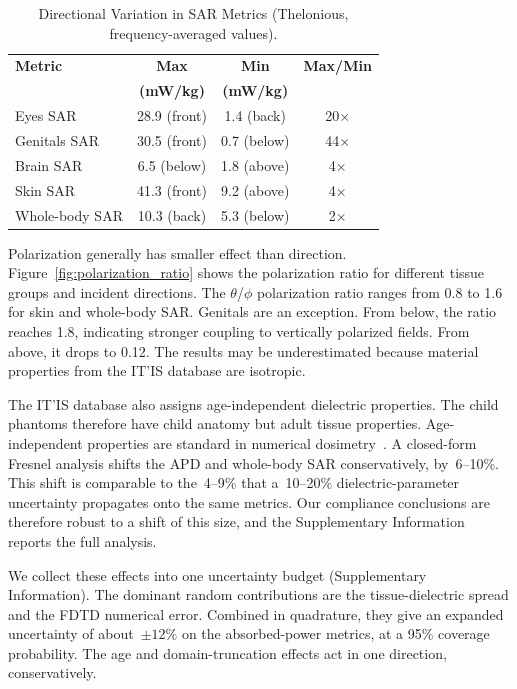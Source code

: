 \documentclass{iopjournal}
\begin{document}
\begin{table}[!t]
\centering
\caption{Directional Variation in \gls{SAR} Metrics (Thelonious, frequency-averaged values).}
\label{table:direction_var}
\begin{tabular}{@{}lccc@{}}
\toprule
\textbf{Metric} & \textbf{Max} & \textbf{Min} & \textbf{Max/Min} \\
 & \textbf{(mW/kg)} & \textbf{(mW/kg)} & \\
\midrule
Eyes SAR & 28.9 (front) & 1.4 (back) & 20$\times$ \\
Genitals SAR & 30.5 (front) & 0.7 (below) & 44$\times$ \\
Brain SAR & 6.5 (below) & 1.8 (above) & 4$\times$ \\
Skin SAR & 41.3 (front) & 9.2 (above) & 4$\times$ \\
Whole-body SAR & 10.3 (back) & 5.3 (below) & 2$\times$ \\
\bottomrule
\end{tabular}
\end{table}

Polarization generally has smaller effect than direction.
Figure~\ref{fig:polarization_ratio} shows the polarization ratio for different tissue groups and incident directions.
The $\theta$/$\phi$ polarization ratio ranges from 0.8 to 1.6 for skin and whole-body \gls{SAR}.
Genitals are an exception. From below, the ratio reaches 1.8, indicating stronger coupling to vertically polarized fields. From above, it drops to 0.12.
The results may be underestimated because material properties from the IT'IS database are isotropic.

The IT'IS database also assigns age-independent dielectric properties.
The child phantoms therefore have child anatomy but adult tissue properties.
Age-independent properties are standard in numerical dosimetry~\citep{bakker2010children,kuehn2009assessment,gosselin2014development}.
A closed-form Fresnel analysis shifts the \gls{APD} and whole-body \gls{SAR} conservatively, by~6--10\%.
This shift is comparable to the~4--9\% that a~10--20\% dielectric-parameter uncertainty propagates onto the same metrics.
Our compliance conclusions are therefore robust to a shift of this size, and the Supplementary Information reports the full analysis.

We collect these effects into one uncertainty budget (Supplementary Information).
The dominant random contributions are the tissue-dielectric spread and the \gls{FDTD} numerical error.
Combined in quadrature, they give an expanded uncertainty of about~$\pm 12\%$ on the absorbed-power metrics, at a 95\% coverage probability.
The age and domain-truncation effects act in one direction, conservatively.
\end{document}
